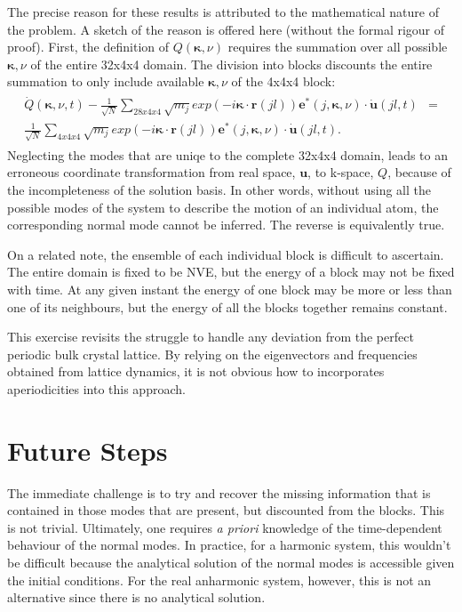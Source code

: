 \documentclass{article}
\begin{document}
The precise reason for these results is attributed to the mathematical nature of the problem. A sketch of the reason is offered here (without the formal rigour of proof). First, the definition of $Q(\pmb{\kappa},\nu)$ requires the summation over all possible $\pmb{\kappa},\nu$ of the entire 32x4x4 domain. The division into blocks discounts the entire summation to only include available $\pmb{\kappa},\nu$ of the 4x4x4 block:
\begin{eqnarray}
\begin{split}
\dot{Q}(\pmb{\kappa},\nu,t)-\frac{1}{\sqrt{N}}\sum_{28x4x4}\sqrt{m_j}exp(-i\pmb{\kappa}\cdot\pmb{r}(jl))\pmb{e}^*(j,\pmb{\kappa},\nu)\cdot\dot{\pmb{u}}(jl,t)&=\\\frac{1}{\sqrt{N}}\sum_{4x4x4}\sqrt{m_j}exp(-i\pmb{\kappa}\cdot\pmb{r}(jl))\pmb{e}^*(j,\pmb{\kappa},\nu)\cdot\dot{\pmb{u}}(jl,t).
\end{split}
\end{eqnarray}
Neglecting the modes that are uniqe to the complete 32x4x4 domain, leads to an erroneous coordinate transformation from real space, $\pmb{u}$, to k-space, ${Q}$, because of the incompleteness of the solution basis. In other words, without using all the possible modes of the system to describe the motion of an individual atom, the corresponding normal mode cannot be inferred. The reverse is equivalently true.

On a related note, the ensemble of each individual block is difficult to ascertain. The entire domain is fixed to be NVE, but the energy of a block may not be fixed with time. At any given instant the energy of one block may be more or less than one of its neighbours, but the energy of all the blocks together remains constant.

This exercise revisits the struggle to handle any deviation from the perfect periodic bulk crystal lattice. By relying on the eigenvectors and frequencies obtained from lattice dynamics, it is not obvious how to incorporates aperiodicities into this approach.

\section*{Future Steps}

The immediate challenge is to try and recover the missing information that is contained in those modes that are present, but discounted from the blocks. This is not trivial. Ultimately, one requires \textit{a priori} knowledge of the time-dependent behaviour of the normal modes. In practice, for a harmonic system, this wouldn't be difficult because the analytical solution of the normal modes is accessible given the initial conditions. For the real anharmonic system, however, this is not an alternative since there is no analytical solution.
\end{document}
